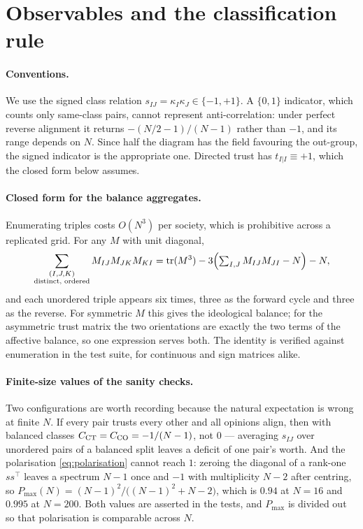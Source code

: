 \section{Observables and the classification rule}
\label{app:observables}

\paragraph{Conventions.} We use the signed class relation
$s_{IJ}=\kappa_I\kappa_J\in\{-1,+1\}$. A $\{0,1\}$ indicator, which counts only
same-class pairs, cannot represent anti-correlation: under perfect reverse
alignment it returns $-(N/2-1)/(N-1)$ rather than $-1$, and its range depends on
$N$. Since half the diagram has the field favouring the out-group, the signed
indicator is the appropriate one. Directed trust has $t_{I|I}\equiv+1$, which the
closed form below assumes.

\paragraph{Closed form for the balance aggregates.} Enumerating triples costs
$O(N^3)$ per society, which is prohibitive across a replicated grid. For any $M$
with unit diagonal,
%
\begin{equation}
  \sum_{\substack{(I,J,K)\\ \text{distinct, ordered}}} M_{IJ}M_{JK}M_{KI}
  = \operatorname{tr}(M^{3}) - 3\Bigl(\textstyle\sum_{I,J}M_{IJ}M_{JI} - N\Bigr) - N ,
\end{equation}
%
and each unordered triple appears six times, three as the forward cycle and three
as the reverse. For symmetric $M$ this gives the ideological balance; for the
asymmetric trust matrix the two orientations are exactly the two terms of the
affective balance, so one expression serves both. The identity is verified
against enumeration in the test suite, for continuous and sign matrices alike.

\paragraph{Finite-size values of the sanity checks.} Two configurations are worth
recording because the natural expectation is wrong at finite $N$. If every pair
trusts every other and all opinions align, then with balanced classes
$C_{\mathrm{CT}}=C_{\mathrm{CO}}=-1/(N-1)$, not $0$ --- averaging $s_{IJ}$ over unordered pairs of a
balanced split leaves a deficit of one pair's worth. And the polarisation
\eqref{eq:polarisation} cannot reach $1$: zeroing the diagonal of a rank-one
$ss^{\!\top}$ leaves a spectrum $N-1$ once and $-1$ with multiplicity $N-2$ after
centring, so $P_{\max}(N)=(N-1)^2/\bigl((N-1)^2+N-2\bigr)$, which is $0.94$ at
$N=16$ and $0.995$ at $N=200$. Both values are asserted in the tests, and
$P_{\max}$ is divided out so that polarisation is comparable across $N$.


